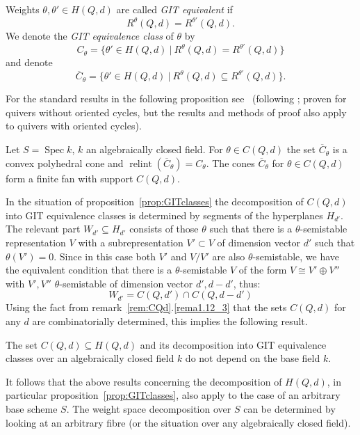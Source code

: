 \documentclass[ALCO,ThmDefs,Unicode,epreuves]{cedram}
\DeclareMathOperator{\Spec}{Spec}
\DeclareMathOperator{\relint}{relint}
\begin{document}
\begin{defi}
Weights $\theta,\theta'\in H(Q,d)$ are called {\it GIT equivalent} if 
\[R^\theta(Q,d)=R^{\theta'}(Q,d).\]
We denote the {\it GIT equivalence class} of $\theta$ by 
\[C_\theta=\{\theta'\in H(Q,d)\:|\:R^\theta(Q,d)=R^{\theta'}(Q,d)\}\]
and denote
\[\overline{C}_\theta=\{\theta'\in H(Q,d)\:|\:R^\theta(Q,d)\subseteq R^{\theta'}(Q,d)\}.\]
\end{defi}


For the standard results in the following proposition see~\cite{Ch08} (following
\cite{Re00}; proven for quivers without oriented cycles, but the results and 
methods of proof also apply to quivers with oriented cycles).

\begin{prop}\label{prop:GITclasses}
Let $S=\Spec k$, $k$ an algebraically closed field.
For $\theta\in C(Q,d)$ the set $\overline{C}_\theta$ is a convex polyhedral
cone and $\relint(\overline{C}_\theta)=C_\theta$. 
The cones $\overline{C}_\theta$ for $\theta\in C(Q,d)$ form a finite 
fan with support $C(Q,d)$.
\end{prop}

In the situation of proposition~\ref{prop:GITclasses} the decomposition of $C(Q,d)$ 
into GIT equivalence classes is determined by segments of the hyperplanes $H_{d'}$. 
The relevant part $W_{d'}\subseteq H_{d'}$ consists of those $\theta$ such that 
there is a $\theta$-semistable representation $V$ with a subrepresentation 
$V'\subset V$ of dimension vector $d'$ such that $\theta(V')=0$. Since in this case 
both $V'$ and $V/V'$ are also $\theta$-semistable, we have the equivalent condition 
that there is a $\theta$-semistable $V$ of the form $V\cong V'\oplus V''$ with 
$V',V''$ $\theta$-semistable of dimension vector $d',d-d'$, 
thus:
\[
W_{d'}=C(Q,d')\cap C(Q,d-d')
\]
Using the fact from remark~\ref{rem:CQd}.\ref{rema1.12_3} that the sets $C(Q,d)$ for any $d$ are 
combinatorially determined, this implies the following result.

\begin{prop}
The set $C(Q,d)\subseteq H(Q,d)$ and its decomposition into GIT equivalence classes 
over an algebraically closed field $k$ do not depend on the base field $k$.
\end{prop}

It follows that the above results concerning the decomposition of $H(Q,d)$, in particular 
proposition~\ref{prop:GITclasses}, also apply to the case of an arbitrary base scheme $S$. 
The weight space decomposition over $S$ can be determined by looking at an arbitrary fibre 
(or the situation over any algebraically closed field).
\end{document}
